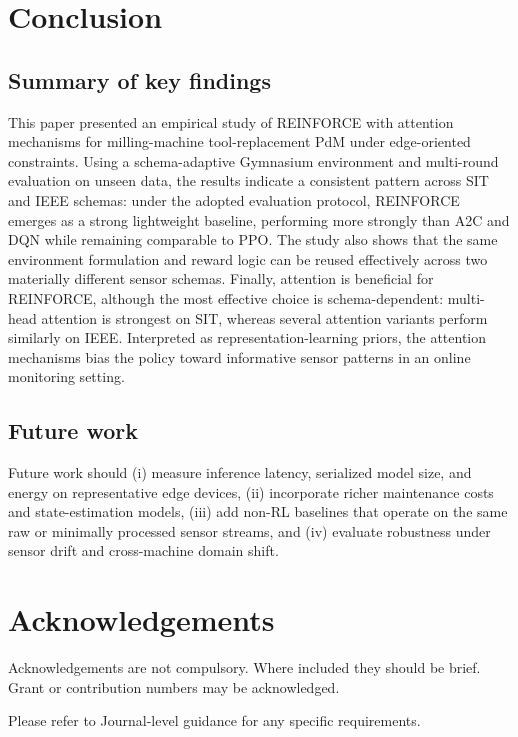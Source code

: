 \documentclass[sn-basic]{sn-jnl} %
\begin{document}
\section{Conclusion}
\label{sec:conclusion}
\subsection{Summary of key findings}
This paper presented an empirical study of \textsc{REINFORCE} with attention mechanisms for milling-machine tool-replacement PdM under edge-oriented constraints. Using a schema-adaptive Gymnasium environment and multi-round evaluation on unseen data, the results indicate a consistent pattern across SIT and IEEE schemas: under the adopted evaluation protocol, \textsc{REINFORCE} emerges as a strong lightweight baseline, performing more strongly than \textsc{A2C} and \textsc{DQN} while remaining comparable to \textsc{PPO}. The study also shows that the same environment formulation and reward logic can be reused effectively across two materially different sensor schemas. Finally, attention is beneficial for \textsc{REINFORCE}, although the most effective choice is schema-dependent: multi-head attention is strongest on SIT, whereas several attention variants perform similarly on IEEE. Interpreted as representation-learning priors, the attention mechanisms bias the policy toward informative sensor patterns in an online monitoring setting.

\subsection{Future work}
Future work should (i) measure inference latency, serialized model size, and energy on representative edge devices, (ii) incorporate richer maintenance costs and state-estimation models, (iii) add non-RL baselines that operate on the same raw or minimally processed sensor streams, and (iv) evaluate robustness under sensor drift and cross-machine domain shift.



\section*{Acknowledgements}

Acknowledgements are not compulsory. Where included they should be brief. Grant or contribution numbers may be acknowledged.

Please refer to Journal-level guidance for any specific requirements.
\end{document}
